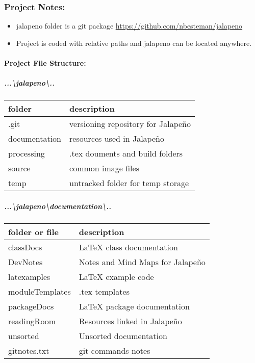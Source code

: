 \subsubsection{Project Notes:}
\begin{itemize}
\item jalapeno folder is a \gls{git} package
\href{https://github.com/nbesteman/jalapeno}{https://github.com/nbesteman/jalapeno}
\item Project is coded with relative paths and jalapeno can be located anywhere.
\end{itemize}
\begin{adjmulticols}{1}{\innerMar}{\outerMar}
\paragraph{Project File Structure:}
\subparagraph*{...\textbackslash jalapeno\textbackslash..}
\begin{tabular}{p{6cm}| p{9cm} }
\footnotesize folder & {\footnotesize description} \\ \hline
.git & versioning repository for Jalape\~no\\
documentation & resources used in Jalape\~no\\
processing & .tex douments and build folders\\
source & common image files\\
temp & untracked folder for temp storage\\
\end{tabular}
\subparagraph*{...\textbackslash jalapeno\textbackslash documentation\textbackslash..}
\begin{tabular}{p{6cm} | p{9cm} }
\footnotesize folder or file & {\footnotesize description} \\ \hline
classDocs & \LaTeX{} class documentation\\
DevNotes & Notes and Mind Maps for Jalape\~no\\
latexamples & \LaTeX{} example code\\
moduleTemplates & .tex templates\\
packageDocs & \LaTeX{} package documentation\\
readingRoom & Resources linked in Jalape\~no\\
unsorted & Unsorted documentation\\
gitnotes.txt & git commands notes\\

\end{tabular}
\end{adjmulticols}
